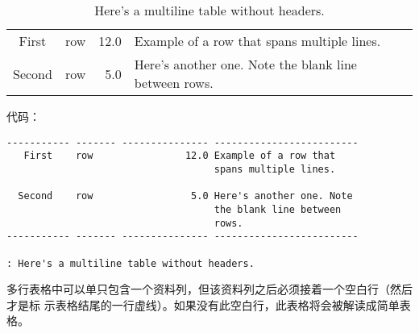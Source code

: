 \documentclass[fancyhdr,bookmark]{ctexbook}
\begin{document}
\begin{longtable}[]{@{}clrl@{}}
\caption{Here's a multiline table without headers.}\tabularnewline
\toprule
\begin{minipage}[t]{0.15\columnwidth}\centering\strut
First\strut
\end{minipage} & \begin{minipage}[t]{0.10\columnwidth}\raggedright\strut
row\strut
\end{minipage} & \begin{minipage}[t]{0.20\columnwidth}\raggedleft\strut
12.0\strut
\end{minipage} & \begin{minipage}[t]{0.31\columnwidth}\raggedright\strut
Example of a row that spans multiple lines.\strut
\end{minipage}\tabularnewline
\begin{minipage}[t]{0.15\columnwidth}\centering\strut
Second\strut
\end{minipage} & \begin{minipage}[t]{0.10\columnwidth}\raggedright\strut
row\strut
\end{minipage} & \begin{minipage}[t]{0.20\columnwidth}\raggedleft\strut
5.0\strut
\end{minipage} & \begin{minipage}[t]{0.31\columnwidth}\raggedright\strut
Here's another one. Note the blank line between rows.\strut
\end{minipage}\tabularnewline
\bottomrule
\end{longtable}

代码：

\begin{lstlisting}
----------- ------- --------------- -------------------------
   First    row                12.0 Example of a row that
                                    spans multiple lines.

  Second    row                 5.0 Here's another one. Note
                                    the blank line between
                                    rows.
----------- ------- --------------- -------------------------

: Here's a multiline table without headers.
\end{lstlisting}

多行表格中可以单只包含一个资料列，但该资料列之后必须接着一个空白行（然后才是标
示表格结尾的一行虚线）。如果没有此空白行，此表格将会被解读成简单表格。
\end{document}
